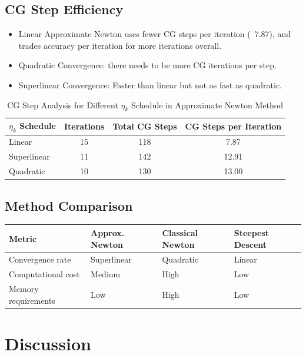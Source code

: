 \documentclass[12pt]{article}
\begin{document}
\subsection{CG Step Efficiency}
\begin{itemize}
    \item Linear Approximate Newton uses fewer CG steps per iteration (~7.87), and trades accuracy per iteration for more iterations overall.
    \item Quadratic Convergence: there needs to be more CG iterations per step.
    \item Superlinear Convergence: Faster than linear but not as fast as quadratic.
\end{itemize}


\begin{table}[h]
    \centering
    \begin{tabular}{lccc}
        \toprule
        \textbf{$\eta_k$ Schedule} & \textbf{Iterations} & \textbf{Total CG Steps} & \textbf{CG Steps per Iteration} \\
        \midrule
        Linear & 15 & 118 & 7.87 \\
        Superlinear & 11 & 142 & 12.91 \\
        Quadratic & 10 & 130 & 13.00 \\
        \bottomrule
    \end{tabular}
    \caption{CG Step Analysis for Different $\eta_k$ Schedule in Approximate Newton Method}
    \label{tab:cg_steps}
\end{table}



\subsection{Method Comparison}
\begin{tabular}{llll}
    \toprule
    Metric & Approx. Newton & Classical Newton & Steepest Descent \\
    \midrule
    Convergence rate & Superlinear & Quadratic & Linear \\
    Computational cost & Medium & High & Low \\
    Memory requirements & Low & High & Low \\
    \bottomrule
\end{tabular}

\section{Discussion}
\end{document}

